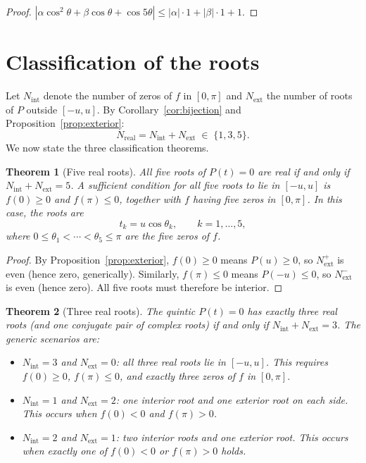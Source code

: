 \documentclass[12pt]{article}
\newtheorem{theorem}{Theorem}
\theoremstyle{definition}
\theoremstyle{remark}
\begin{document}
\begin{proof}
$|\alpha\cos^2\!\theta + \beta\cos\theta + \cos 5\theta| \leq |\alpha| \cdot 1 + |\beta| \cdot 1 + 1$.
\end{proof}

\section{Classification of the roots}

Let $N_{\mathrm{int}}$ denote the number of zeros of $f$ in $[0,\pi]$ and $N_{\mathrm{ext}}$ the number of roots of $P$ outside $[-u,u]$. By Corollary~\ref{cor:bijection} and Proposition~\ref{prop:exterior}:
\begin{equation}\label{eq:Nreal}
N_{\mathrm{real}} = N_{\mathrm{int}} + N_{\mathrm{ext}} \;\in\; \{1, 3, 5\}.
\end{equation}
We now state the three classification theorems.

\begin{theorem}[Five real roots]\label{thm:five}
All five roots of $P(t) = 0$ are real if and only if $N_{\mathrm{int}} + N_{\mathrm{ext}} = 5$. A sufficient condition for all five roots to lie in $[-u,u]$ is $f(0) \geq 0$ and $f(\pi) \leq 0$, together with $f$ having five zeros in $[0,\pi]$. In this case, the roots are
\[
t_k = u\cos\theta_k, \qquad k = 1, \ldots, 5,
\]
where $0 \leq \theta_1 < \cdots < \theta_5 \leq \pi$ are the five zeros of $f$.
\end{theorem}

\begin{proof}
By Proposition~\ref{prop:exterior}, $f(0) \geq 0$ means $P(u) \geq 0$, so $N_{\mathrm{ext}}^{+}$ is even (hence zero, generically). Similarly, $f(\pi) \leq 0$ means $P(-u) \leq 0$, so $N_{\mathrm{ext}}^{-}$ is even (hence zero). All five roots must therefore be interior.
\end{proof}

\begin{theorem}[Three real roots]\label{thm:three}
The quintic $P(t) = 0$ has exactly three real roots (and one conjugate pair of complex roots) if and only if $N_{\mathrm{int}} + N_{\mathrm{ext}} = 3$. The generic scenarios are:
\begin{itemize}
\item[(a)] $N_{\mathrm{int}} = 3$ and $N_{\mathrm{ext}} = 0$: all three real roots lie in $[-u,u]$. This requires $f(0) \geq 0$, $f(\pi) \leq 0$, and exactly three zeros of $f$ in $[0,\pi]$.
\item[(b)] $N_{\mathrm{int}} = 1$ and $N_{\mathrm{ext}} = 2$: one interior root and one exterior root on each side. This occurs when $f(0) < 0$ and $f(\pi) > 0$.
\item[(c)] $N_{\mathrm{int}} = 2$ and $N_{\mathrm{ext}} = 1$: two interior roots and one exterior root. This occurs when exactly one of $f(0) < 0$ or $f(\pi) > 0$ holds.
\end{itemize}
\end{theorem}
\end{document}
